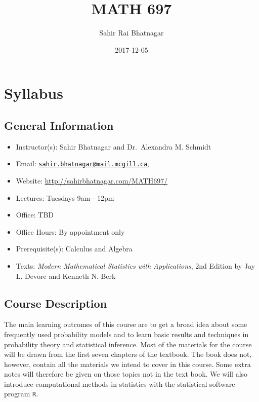 \documentclass[]{book}
\title{MATH 697}
\author{Sahir Rai Bhatnagar}
\date{2017-12-05}
\providecommand{\tightlist}{%
  \setlength{\itemsep}{0pt}\setlength{\parskip}{0pt}}
\theoremstyle{definition}
\theoremstyle{definition}
\theoremstyle{definition}
\theoremstyle{remark}
\begin{document}
\maketitle

{
\setcounter{tocdepth}{1}
\tableofcontents
}
\chapter*{Syllabus}\label{syllabus}

\section*{General Information}\label{general-information}

\begin{itemize}
\tightlist
\item
  Instructor(s): Sahir Bhatnagar and Dr.~Alexandra M. Schmidt
\item
  Email:
  \href{mailto:sahir.bhatnagar@mail.mcgill.ca}{\nolinkurl{sahir.bhatnagar@mail.mcgill.ca}},
\item
  Website: \url{http://sahirbhatnagar.com/MATH697/}
\item
  Lectures: Tuesdays 9am - 12pm
\item
  Office: TBD
\item
  Office Hours: By appointment only
\item
  Prerequisite(s): Calculus and Algebra
\item
  Texts: \emph{Modern Mathematical Statistics with Applications}, 2nd
  Edition by Jay L. Devore and Kenneth N. Berk
\end{itemize}

\section*{Course Description}\label{course-description}

The main learning outcomes of this course are to get a broad idea about
some frequently used probability models and to learn basic results and
techniques in probability theory and statistical inference. Most of the
materials for the course will be drawn from the first seven chapters of
the textbook. The book does not, however, contain all the materials we
intend to cover in this course. Some extra notes will therefore be given
on those topics not in the text book. We will also introduce
computational methods in statistics with the statistical software
program \texttt{R}.
\end{document}
